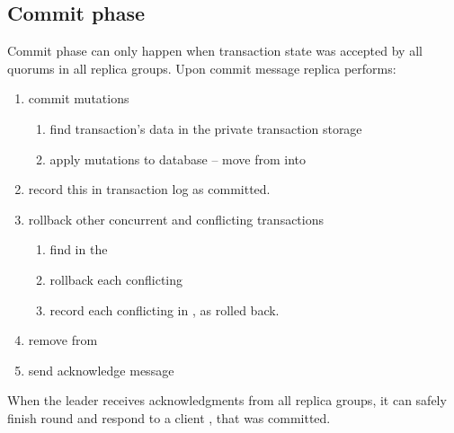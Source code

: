 \subsection{Commit phase}
Commit phase can only happen when transaction state \txState was accepted by all quorums in all replica groups. Upon commit message replica performs:
\begin{enumerate}
\item commit mutations \mutations
\begin{enumerate}
   \item find transaction’s data in the private transaction storage \txStorage
   \item apply mutations to database \database  -- move \mutations from \txStorage into \database
   \end{enumerate}
\item record this \txState in transaction log \txLog as committed.
\item rollback other concurrent and conflicting transactions \conflictingTxSet
 \begin{enumerate}
   \item find \conflictingTxSet in the \txIndex
   \item rollback each conflicting 
   \item record each conflicting  in \txLog, as rolled back.
  \end{enumerate}
\item remove \txState from \txIndex
\item send acknowledge message 
\end{enumerate}

When the leader receives acknowledgments from all replica groups, it can safely finish \mpt round and respond to a client \client, that \transaction was committed.


